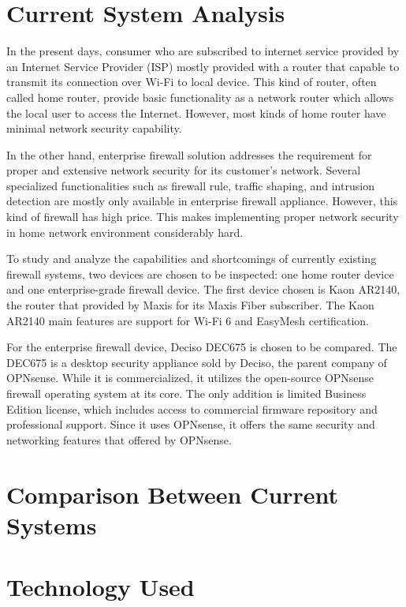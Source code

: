 \documentclass[../index.tex]{subfiles}
\begin{document}
\section{Current System Analysis}

In the present days, consumer who are subscribed to internet service provided by an Internet Service
Provider (ISP) mostly provided with a router that capable to transmit its connection over Wi-Fi to
local device. This kind of router, often called home router, provide basic functionality as a
network router which allows the local user to access the Internet. However, most kinds of home
router have minimal network security capability.

In the other hand, enterprise firewall solution addresses the requirement for proper and extensive
network security for its customer’s network. Several specialized functionalities such as firewall
rule, traffic shaping, and intrusion detection are mostly only available in enterprise firewall
appliance. However, this kind of firewall has high price. This makes implementing proper network
security in home network environment considerably hard.

To study and analyze the capabilities and shortcomings of currently existing firewall systems, two
devices are chosen to be inspected: one home router device and one enterprise-grade firewall device.
The first device chosen is Kaon AR2140, the router that provided by Maxis for its Maxis Fiber
subscriber. The Kaon AR2140 main features are support for Wi-Fi 6 and EasyMesh certification.

For the enterprise firewall device, Deciso DEC675 is chosen to be compared. The DEC675 is a desktop
security appliance sold by Deciso, the parent company of OPNsense. While it is commercialized, it
utilizes the open-source OPNsense firewall operating system at its core. The only addition is
limited Business Edition license, which includes access to commercial firmware repository and
professional support. Since it uses OPNsense, it offers the same security and networking features
that offered by OPNsense.

\section{Comparison Between Current Systems}

\section{Technology Used}
\end{document}
